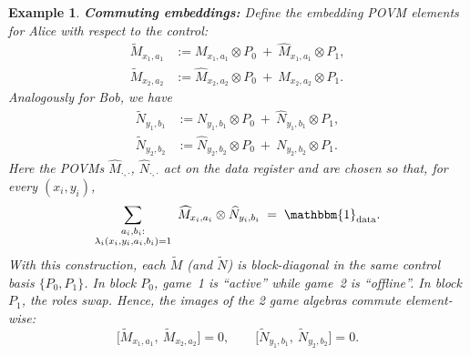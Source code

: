 \documentclass{article}
\newtheorem{example}{Example}
\begin{document}
\begin{example}
    \textbf{Commuting embeddings:} Define the embedding POVM elements for Alice with respect to the control:
    \begin{align*}
        \widetilde M_{x_1,a_1} &:= M_{x_1,a_1}\otimes P_0\ +\ \widehat M_{x_1,a_1}\otimes P_1,\\
        \widetilde M_{x_2,a_2} &:= \widehat M_{x_2,a_2}\otimes P_0\ +\ M_{x_2,a_2}\otimes P_1.
    \end{align*}
    Analogously for Bob, we have 
    \begin{align*}
        \widetilde N_{y_1,b_1} &:= N_{y_1,b_1}\otimes P_0\ +\ \widehat N_{y_1,b_1}\otimes P_1,\\
        \widetilde N_{y_2,b_2} &:= \widehat N_{y_2,b_2}\otimes P_0\ +\ N_{y_2,b_2}\otimes P_1.
    \end{align*}
    Here the POVMs $\widehat M_{\cdot,\cdot}$, $\widehat N_{\cdot,\cdot}$ act on the data register and are chosen so that, for every $(x_i,y_i)$,
    \begin{equation}
        \sum_{\substack{a_i,b_i:\\\lambda_i(x_i,y_i,a_i,b_i)=1}}\ \widehat M_{x_i,a_i}\otimes \widehat N_{y_i,b_i}\;=\;\mathbbm{1}_{\text{data}}.
    \end{equation}
    With this construction, each $\widetilde M$ (and $\widetilde N$) is block-diagonal in the same control basis $\{P_0,P_1\}$. In block $P_0$, game~1 is ``active'' while game~2 is ``offline''. In block $P_1$, the roles swap. Hence, the images of the 2 game algebras commute element-wise:
    \begin{equation}
        \big[\widetilde M_{x_1,a_1},\ \widetilde M_{x_2,a_2}\big]=0,
        \qquad
        \big[\widetilde N_{y_1,b_1},\ \widetilde N_{y_2,b_2}\big]=0.     
    \end{equation}


\end{example}
\end{document}
